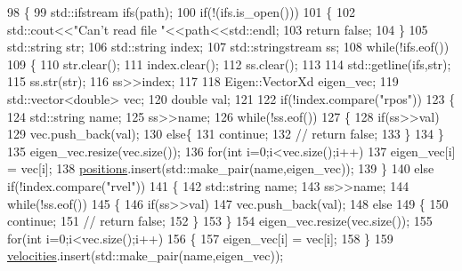 \begin{DoxyCode}
98 \{
99     std::ifstream ifs(path);
100     \textcolor{keywordflow}{if}(!(ifs.is\_open()))
101     \{
102         std::cout<<\textcolor{stringliteral}{"Can't read file "}<<path<<std::endl;
103         \textcolor{keywordflow}{return} \textcolor{keyword}{false};
104     \}
105     std::string str;
106     std::string index;
107     std::stringstream ss;
108     \textcolor{keywordflow}{while}(!ifs.eof())
109     \{
110         str.clear();
111         index.clear();
112         ss.clear();
113 
114         std::getline(ifs,str);
115         ss.str(str);    
116         ss>>index;
117 
118         Eigen::VectorXd eigen\_vec;
119         std::vector<double> vec;
120         \textcolor{keywordtype}{double} val;
121 
122         \textcolor{keywordflow}{if}(!index.compare(\textcolor{stringliteral}{"rpos"}))
123         \{
124             std::string name;
125             ss>>name;
126             \textcolor{keywordflow}{while}(!ss.eof())
127             \{
128                 \textcolor{keywordflow}{if}(ss>>val)
129                     vec.push\_back(val);
130                 \textcolor{keywordflow}{else}\{
131                     \textcolor{keywordflow}{continue};
132                     \textcolor{comment}{// return false;}
133                 \}
134             \}
135             eigen\_vec.resize(vec.size());
136             \textcolor{keywordflow}{for}(\textcolor{keywordtype}{int} i=0;i<vec.size();i++)
137                 eigen\_vec[i] = vec[i];
138             \hyperlink{class_v_p_c_1_1_record_aeea0f4576199ce09ffc7870c792624d0}{positions}.insert(std::make\_pair(name,eigen\_vec));
139         \}
140         \textcolor{keywordflow}{else} \textcolor{keywordflow}{if}(!index.compare(\textcolor{stringliteral}{"rvel"}))
141         \{
142             std::string name;
143             ss>>name;
144             \textcolor{keywordflow}{while}(!ss.eof())
145             \{
146                 \textcolor{keywordflow}{if}(ss>>val)
147                     vec.push\_back(val);
148                 \textcolor{keywordflow}{else}
149                 \{
150                     \textcolor{keywordflow}{continue};
151                     \textcolor{comment}{// return false;}
152                 \}
153             \}
154             eigen\_vec.resize(vec.size());
155             \textcolor{keywordflow}{for}(\textcolor{keywordtype}{int} i=0;i<vec.size();i++)
156             \{
157                 eigen\_vec[i] = vec[i];
158             \}
159             \hyperlink{class_v_p_c_1_1_record_a6d0ac69f7cb390fd819cb006f23d6e32}{velocities}.insert(std::make\_pair(name,eigen\_vec));

\end{DoxyCode}
